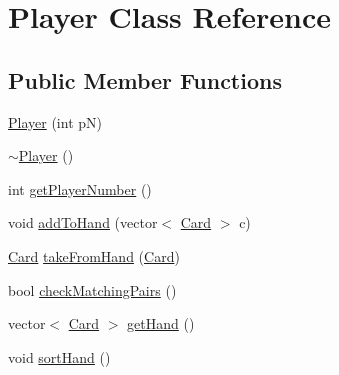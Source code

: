 \hypertarget{class_player}{\section{Player Class Reference}
\label{class_player}
}
\subsection*{Public Member Functions}
\begin{DoxyCompactItemize}
\item 
\hyperlink{class_player_a80d1293f6f49b886db318f1dae7be23b}{Player} (int p\-N)
\item 
\hyperlink{class_player_a749d2c00e1fe0f5c2746f7505a58c062}{$\sim$\-Player} ()
\item 
int \hyperlink{class_player_ae72235dee0a2f7abbcb82002164623aa}{get\-Player\-Number} ()
\item 
void \hyperlink{class_player_ace93c12489cea500770591ccb47a2a0c}{add\-To\-Hand} (vector$<$ \hyperlink{class_card}{Card} $>$ c)
\item 
\hyperlink{class_card}{Card} \hyperlink{class_player_aa98f63d75da7cae403510b4c1e2a6ce9}{take\-From\-Hand} (\hyperlink{class_card}{Card})
\item 
bool \hyperlink{class_player_adf635ce5997b0d4647a6f7d09b526dac}{check\-Matching\-Pairs} ()
\item 
vector$<$ \hyperlink{class_card}{Card} $>$ \hyperlink{class_player_a6ca673336972f29fdc094b3f0f1f7f84}{get\-Hand} ()
\item 
void \hyperlink{class_player_a2369527c90f1168eac2dc3f7bfaefc43}{sort\-Hand} ()
\end{DoxyCompactItemize}


